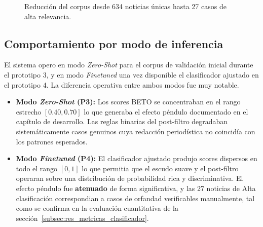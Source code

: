 \vspace{0.5cm}
\begin{figure}[htbp]
\centering
{}
\caption{Reducción del corpus desde 634 noticias únicas hasta 27 casos de alta relevancia.}
\label{fig:grafica_embudo}
\end{figure}
\vspace{0.4cm}

\subsection{Comportamiento por modo de inferencia}
\label{subsec:res_inferencia}

El sistema opero en modo \textit{Zero-Shot} para el corpus de validación inicial durante el prototipo 3, y en modo \textit{Finetuned}
una vez disponible el clasificador ajustado en el prototipo 4. La diferencia operativa entre ambos modos fue muy notable.

\begin{itemize}
    \item \textbf{Modo \textit{Zero-Shot} (P3):} Los scores BETO se concentraban en el
          rango estrecho $[0.40, 0.70]$ lo que generaba el efecto péndulo documentado en el
          capítulo de desarrollo. Las reglas binarias del post-filtro degradaban sistemáticamente
          casos genuinos cuya redacción periodística no coincidía con los patrones esperados.

    \item \textbf{Modo \textit{Finetuned} (P4):} El clasificador ajustado produjo scores
          dispersos en todo el rango $[0, 1]$ lo que permitia que el escudo suave y el
          post-filtro operaran sobre una distribución de probabilidad rica y discriminativa.
          El efecto péndulo fue \textbf{atenuado} de forma significativa, y las 27 noticias
          de Alta clasificación correspondian a casos de orfandad verificables manualmente,
          tal como se confirma en la evaluación cuantitativa de la
          sección~\ref{subsec:res_metricas_clasificador}.
    \end{itemize}

